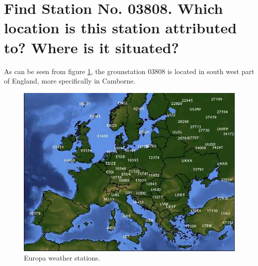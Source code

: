\documentclass{article}
\begin{document}



\newpage				%
\renewcommand{\contentsname}{Table of Contents}
\tableofcontents		%


\newpage
\section{Find Station No. 03808. Which location is this station attributed to? Where is it situated?}
As can be seen from figure \ref{fig:1}, the grounstation 03808 is located in south west part of England, more specifically in Camborne. 

\begin{figure}[H]
	\centering
 	\includegraphics[width=1\textwidth]{figures/europe.jpg}
 	\caption{Europa weather stations.}
 	\label{fig:1}
\end{figure}


\end{document}
